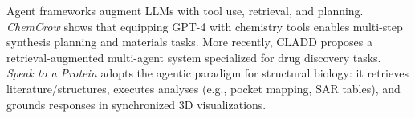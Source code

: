 \documentclass{article}
\begin{document}
Agent frameworks augment LLMs with tool use, retrieval, and planning. \emph{ChemCrow} \citep{bran2024chemcrow} shows that equipping GPT-4 with chemistry tools enables multi-step synthesis planning and materials tasks. More recently, CLADD \citep{lee2025cladd} proposes a retrieval-augmented multi-agent system specialized for drug discovery tasks. \emph{Speak to a Protein} adopts the agentic paradigm for structural biology: it retrieves literature/structures, executes analyses (e.g., pocket mapping, SAR tables), and grounds responses in synchronized 3D visualizations.

\end{document}
